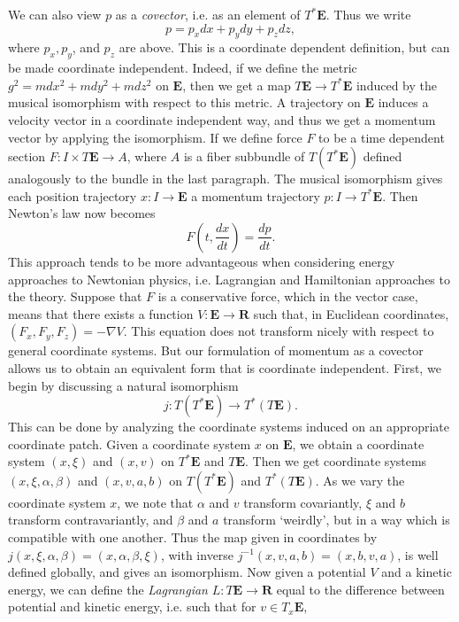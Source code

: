We can also view $p$ as a \emph{covector}, i.e. as an element of $T^* \mathbf{E}$. Thus we write
%
\[ p = p_x dx + p_y dy + p_z dz, \]
%
where $p_x,p_y$, and $p_z$ are above. This is a coordinate dependent definition, but can be made coordinate independent. Indeed, if we define the metric $g^2 = m dx^2 + m dy^2 + m dz^2$ on $\mathbf{E}$, then we get a map $T\mathbf{E} \to T^*\mathbf{E}$ induced by the musical isomorphism with respect to this metric. A trajectory on $\mathbf{E}$ induces a velocity vector in a coordinate independent way, and thus we get a momentum vector by applying the isomorphism. If we define force $F$ to be a time dependent section $F: I \times T \mathbf{E} \to A$, where $A$ is a fiber subbundle of $T(T^* \mathbf{E})$ defined analogously to the bundle in the last paragraph. The musical isomorphism gives each position trajectory $x: I \to \mathbf{E}$ a momentum trajectory $p: I \to T^* \mathbf{E}$. Then Newton's law now becomes
%
\[ F \left( t, \frac{dx}{dt} \right) = \frac{dp}{dt}. \]
%
This approach tends to be more advantageous when considering energy approaches to Newtonian physics, i.e. Lagrangian and Hamiltonian approaches to the theory. Suppose that $F$ is a conservative force, which in the vector case, means that there exists a function $V: \mathbf{E} \to \mathbf{R}$ such that, in Euclidean coordinates, $(F_x,F_y,F_z) = - \nabla V$. This equation does not transform nicely with respect to general coordinate systems. But our formulation of momentum as a covector allows us to obtain an equivalent form that is coordinate independent. First, we begin by discussing a natural isomorphism
%
\[ j: T(T^* \mathbf{E}) \to T^*(T \mathbf{E}). \]
%
This can be done by analyzing the coordinate systems induced on an appropriate coordinate patch. Given a coordinate system $x$ on $\mathbf{E}$, we obtain a coordinate system $(x,\xi)$ and $(x,v)$ on $T^* \mathbf{E}$ and $T \mathbf{E}$. Then we get coordinate systems $(x,\xi,\alpha,\beta)$ and $(x,v,a,b)$ on $T(T^* \mathbf{E})$ and $T^*(T \mathbf{E})$. As we vary the coordinate system $x$, we note that $\alpha$ and $v$ transform covariantly, $\xi$ and $b$ transform contravariantly, and $\beta$ and $a$ transform `weirdly', but in a way which is compatible with one another. Thus the map given in coordinates by $j(x,\xi,\alpha,\beta) = (x,\alpha,\beta,\xi)$, with inverse $j^{-1}(x,v,a,b) = (x,b,v,a)$, is well defined globally, and gives an isomorphism. Now given a potential $V$ and a kinetic energy, we can define the \emph{Lagrangian} $L: T \mathbf{E} \to \mathbf{R}$ equal to the difference between potential and kinetic energy, i.e. such that for $v \in T_x \mathbf{E}$,
